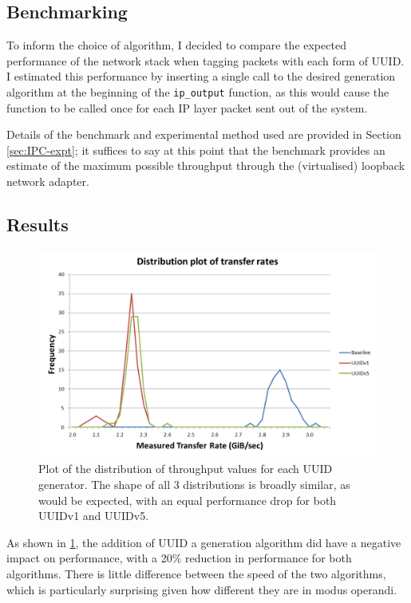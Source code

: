 \documentclass[a4paper,12pt,twoside,openright]{report}
\begin{document}
	\subsection{Benchmarking}
	
	To inform the choice of algorithm, I decided to compare the expected performance of the network stack when tagging packets with each form of UUID. I estimated this performance by inserting a single call to the desired generation algorithm at the beginning of the \verb|ip_output| function, as this would cause the function to be called once for each IP layer packet sent out of the system.
	
	Details of the benchmark and experimental method used are provided in Section \ref{sec:IPC-expt}; it suffices to say at this point that the benchmark provides an estimate of the maximum possible throughput through the (virtualised) loopback network adapter.
	
	\subsection{Results}
	
	\begin{figure}
		\includegraphics[width=\linewidth]{include/IPC-uuid-bench.png}
		\caption{Plot of the distribution of throughput values for each UUID generator. The shape of all 3 distributions is broadly similar, as would be expected, with an equal performance drop for both UUIDv1 and UUIDv5.}
		\label{fig:IPC-uuid-bench}
	\end{figure}
	
	As shown in \figurename{\ref{fig:IPC-uuid-bench}}, the addition of UUID a generation algorithm did have a negative impact on performance, with a 20\% reduction in performance for both algorithms. There is little difference between the speed of the two algorithms, which is particularly surprising given how different they are in modus operandi.
	
\end{document}
